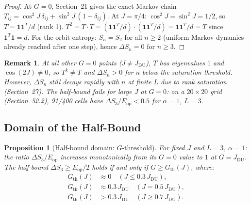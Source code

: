 \documentclass[12pt,a4paper]{article}
\newtheorem{proposition}[theorem]{Proposition}
\newtheorem{remark}[theorem]{Remark}
\begin{document}
\begin{proof}
At $G=0$, Section~21 gives the exact Markov chain $T_{ij}=\cos^2J\,\delta_{ij}+\sin^2J\,(1-\delta_{ij})$.
At $J=\pi/4$: $\cos^2J=\sin^2J=1/2$, so $T=\mathbf{1}\mathbf{1}^T/d$ (rank 1).
$T^2=T\cdot T=(\mathbf{1}\mathbf{1}^T/d)\cdot(\mathbf{1}\mathbf{1}^T/d)
=\mathbf{1}\mathbf{1}^T/d=T$ since $\mathbf{1}^T\mathbf{1}=d$.
For the orbit entropy: $S_n=S_2$ for all $n\geq2$ (uniform Markov dynamics already
reached after one step), hence $\Delta S_n=0$ for $n\geq3$.
\end{proof}

\begin{remark}
At all other $G=0$ points ($J\neq J_\mathrm{DU}$), $T$ has eigenvalues $1$ and $\cos(2J)\neq0$,
so $T^k\neq T$ and $\Delta S_n>0$ for $n$ below the saturation threshold.
However, $\Delta S_n$ still decays rapidly with $n$ at finite $L$ due to
rank saturation (Section~27).  The half-bound fails for large $J$ at $G=0$:
on a $20\times20$ grid (Section~52.2), 91/400 cells have $\Delta S_3/E_\mathrm{op}<0.5$
for $\alpha=1$, $L=3$.
\end{remark}

\subsection{Domain of the Half-Bound}
\label{subsec:domain_half}

\begin{proposition}[Half-bound domain: $G$-threshold]\label{prop:half_domain}
For fixed $J$ and $L=3$, $\alpha=1$: the ratio $\Delta S_3/E_\mathrm{op}$ increases
monotonically from its $G=0$ value to $1$ at $G=J_\mathrm{DU}$.
The half-bound $\Delta S_3\geq E_\mathrm{op}/2$ holds if and only if
$G\geq G_\mathrm{th}(J)$, where:
\begin{align*}
  G_\mathrm{th}(J) &\approx 0 \quad (J\leq 0.3\,J_\mathrm{DU}),\\
  G_\mathrm{th}(J) &\approx 0.3\,J_\mathrm{DU} \quad (J= 0.5\,J_\mathrm{DU}),\\
  G_\mathrm{th}(J) &> 0.3\,J_\mathrm{DU} \quad (J\geq 0.7\,J_\mathrm{DU}).
\end{align*}
\end{proposition}
\end{document}
